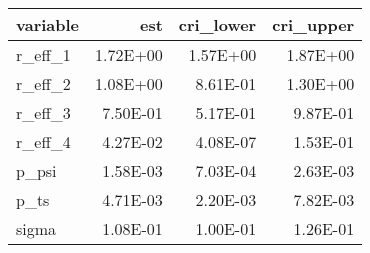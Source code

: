 \begin{table}[ht]
\centering
\begin{tabular}{lrrr}
  \hline
variable & est & cri\_lower & cri\_upper \\ 
  \hline
r\_eff\_1 & 1.72E+00 & 1.57E+00 & 1.87E+00 \\ 
  r\_eff\_2 & 1.08E+00 & 8.61E-01 & 1.30E+00 \\ 
  r\_eff\_3 & 7.50E-01 & 5.17E-01 & 9.87E-01 \\ 
  r\_eff\_4 & 4.27E-02 & 4.08E-07 & 1.53E-01 \\ 
  p\_psi & 1.58E-03 & 7.03E-04 & 2.63E-03 \\ 
  p\_ts & 4.71E-03 & 2.20E-03 & 7.82E-03 \\ 
  sigma & 1.08E-01 & 1.00E-01 & 1.26E-01 \\ 
   \hline
\end{tabular}
\end{table}
